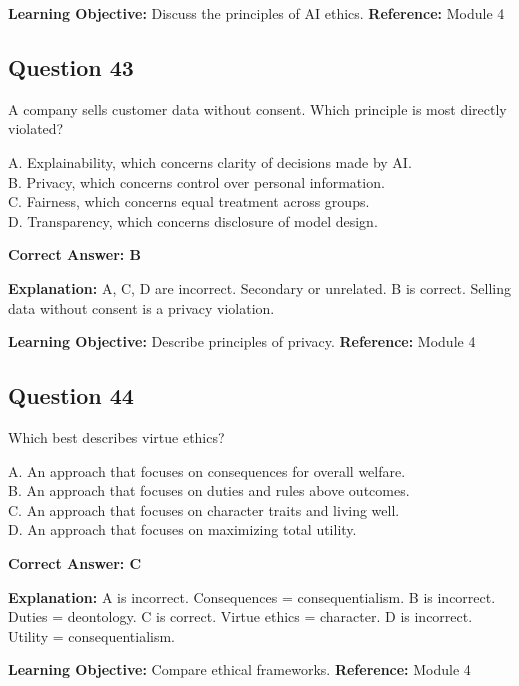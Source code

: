 \documentclass[11pt]{article}
\begin{document}
	\textbf{Learning Objective:} Discuss the principles of AI ethics.
	\textbf{Reference:} Module 4
	
	\subsection*{Question 43}
	A company sells customer data without consent. Which principle is most
	directly violated?
	
	A. Explainability, which concerns clarity of decisions made by AI.\\
	B. Privacy, which concerns control over personal information.\\
	C. Fairness, which concerns equal treatment across groups.\\
	D. Transparency, which concerns disclosure of model design.
	
	\vspace{0.4em}
	\textbf{Correct Answer: B}
	
	\textbf{Explanation:}
	A, C, D are incorrect. Secondary or unrelated.
	B is correct. Selling data without consent is a privacy violation.
	
	\textbf{Learning Objective:} Describe principles of privacy.
	\textbf{Reference:} Module 4
	
	\subsection*{Question 44}
	Which best describes virtue ethics?
	
	A. An approach that focuses on consequences for overall welfare.\\
	B. An approach that focuses on duties and rules above outcomes.\\
	C. An approach that focuses on character traits and living well.\\
	D. An approach that focuses on maximizing total utility.
	
	\vspace{0.4em}
	\textbf{Correct Answer: C}
	
	\textbf{Explanation:}
	A is incorrect. Consequences = consequentialism.
	B is incorrect. Duties = deontology.
	C is correct. Virtue ethics = character.
	D is incorrect. Utility = consequentialism.
	
	\textbf{Learning Objective:} Compare ethical frameworks.
	\textbf{Reference:} Module 4
	
\end{document}
